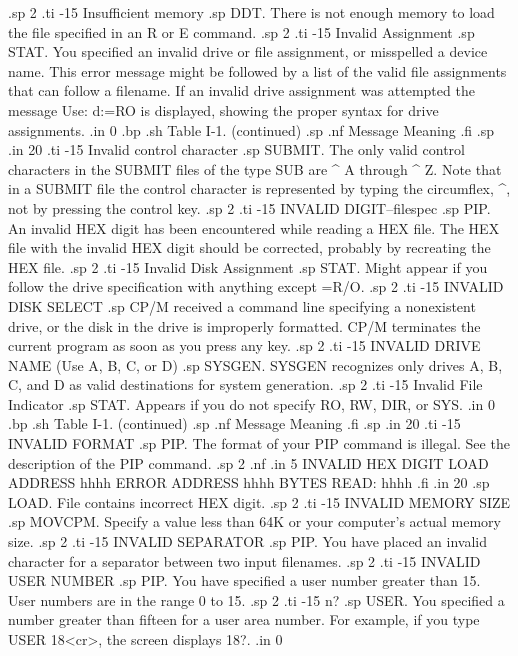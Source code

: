 .sp 2
.ti -15
Insufficient memory
.sp
DDT.  There is not enough memory to load the file specified in an 
R or E command.
.sp 2
.ti -15
Invalid Assignment
.sp
STAT.  You specified an invalid drive or file assignment, or 
misspelled a device name.  This error message might be followed 
by a list of the valid file assignments that can follow a 
filename.  If an invalid drive assignment was attempted the 
message Use: d:=RO is displayed, showing the proper syntax for 
drive assignments.
.in 0
.bp
.sh
                     Table I-1.  (continued)
.sp
.nf
     Message        Meaning
.fi
.sp
.in 20
.ti -15
Invalid control character
.sp
SUBMIT.  The only valid control characters in the SUBMIT files of 
the type SUB are ^ A through ^ Z.  Note that in a SUBMIT file the 
control character is represented by typing the circumflex, ^, not 
by pressing the control key.
.sp 2
.ti -15
INVALID DIGIT--{filespec}
.sp
PIP.  An invalid HEX digit has been encountered while reading a 
HEX file.  The HEX file with the invalid HEX digit should be 
corrected, probably by recreating the HEX file.
.sp 2
.ti -15
Invalid Disk Assignment
.sp
STAT.  Might appear if you follow the drive specification with 
anything except =R/O.
.sp 2
.ti -15
INVALID DISK SELECT
.sp
CP/M received a command line specifying a nonexistent drive, or 
the disk in the drive is improperly formatted.  CP/M terminates 
the current program as soon as you press any key.
.sp 2
.ti -15
INVALID DRIVE NAME (Use A, B, C, or D)
.sp
SYSGEN.  SYSGEN recognizes only drives A, B, C, and D as valid 
destinations for system generation.
.sp 2
.ti -15
Invalid File Indicator
.sp
STAT.  Appears if you do not specify RO, RW, DIR, or SYS.
.in 0
.bp
.sh
                     Table I-1.  (continued)
.sp
.nf
     Message        Meaning
.fi
.sp
.in 20
.ti -15
INVALID FORMAT
.sp
PIP.  The format of your PIP command is illegal.  See the 
description of the PIP command.
.sp 2
.nf
.in 5
INVALID HEX DIGIT
LOAD ADDRESS hhhh
ERROR ADDRESS hhhh
BYTES READ:
hhhh
.fi
.in 20
.sp
LOAD.  File contains incorrect HEX digit.
.sp 2
.ti -15
INVALID MEMORY SIZE
.sp
MOVCPM.  Specify a value less than 64K or your computer's actual 
memory size.
.sp 2
.ti -15
INVALID SEPARATOR
.sp
PIP.  You have placed an invalid character for a separator 
between two input filenames.
.sp 2
.ti -15
INVALID USER NUMBER
.sp
PIP.  You have specified a user number greater than 15.  User 
numbers are in the range 0 to 15.
.sp 2
.ti -15
n?
.sp
USER.  You specified a number greater than fifteen for a user 
area number.  For example, if you type USER 18<cr>, the screen 
displays 18?.
.in 0
